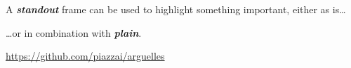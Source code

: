 \documentclass{beamer}
\begin{document}
  \begin{frame}[standout]
  A \textit{\bfseries standout} frame can be used to highlight something important, either as is\ldots
  \end{frame}

  \begin{frame}
  \ldots or in combination with \textit{\bfseries plain}.
  \end{frame}

  \appendix
  \begin{frame}
  \scalebox{5}{\faGithub}\par\bigskip
  \url{https://github.com/piazzai/arguelles}
  \end{frame}
\end{document}
